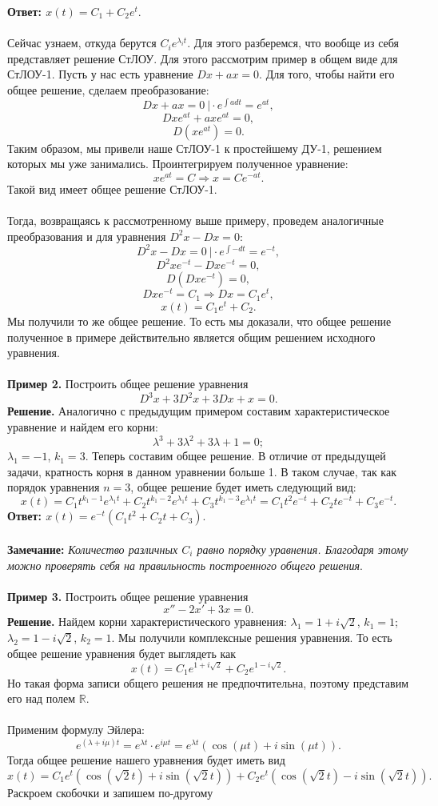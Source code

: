 \documentclass[a4paper, 12pt]{article}
\newcommand{\Rm}{\mathbb{R}}
\begin{document}
	\textbf{Ответ: $x(t) = C_1 + C_2e^t.$}\\\\
	Сейчас узнаем, откуда берутся $C_ie^{\lambda_i t}$. Для этого разберемся, что вообще из себя представляет решение СтЛОУ. Для этого рассмотрим пример в общем виде для СтЛОУ-1. Пусть у нас есть уравнение $Dx + ax = 0$. Для того, чтобы найти его общее решение, сделаем преобразование:
	$$Dx + ax = 0\ \Big| \cdot e^{\int adt}= e^{at},$$
	$$Dxe^{at} + axe^{at} = 0,$$
	$$D(xe^{at}) = 0.$$
	Таким образом, мы привели наше СтЛОУ-1 к простейшему ДУ-1, решением которых мы уже занимались. Проинтегрируем полученное уравнение:
	$$xe^{at} = C\Rightarrow x = Ce^{-at}.$$
	Такой вид имеет общее решение СтЛОУ-1.\\\\
	Тогда, возвращаясь к рассмотренному выше примеру, проведем аналогичные преобразования и для уравнения $D^2x - Dx = 0$:
	$$D^2x - Dx = 0\ \Big| \cdot e^{\int-dt} = e^{-t},$$
	$$D^2xe^{-t} - Dxe^{-t} = 0,$$
	$$D(Dxe^{-t}) = 0,$$
	$$Dxe^{-t} = C_1\Rightarrow Dx = C_1e^t,$$
	$$x(t) = C_1e^t + C_2.$$
	Мы получили то же общее решение. То есть мы доказали, что общее решение полученное в примере действительно является общим решением исходного уравнения.\\\\
	\textbf{Пример 2.} Построить общее решение уравнения $$D^3x + 3D^2x + 3Dx + x = 0.$$
	\textbf{Решение.} Аналогично с предыдущим примером составим характеристическое уравнение и найдем его корни: $$\lambda^3 + 3\lambda^2 + 3\lambda + 1 = 0;$$
	$\lambda_1 = -1$, $k_1 = 3$. Теперь составим общее решение. В отличие от предыдущей задачи, кратность корня в данном уравнении больше 1. В таком случае, так как порядок уравнения $n = 3$, общее решение будет иметь следующий вид:
	$$x(t) = C_1t^{k_1 - 1}e^{\lambda_1 t} + C_2t^{k_1 - 2}e^{\lambda_1 t} + C_3t^{k_1 - 3}e^{\lambda_1 t} = C_1t^2e^{-t} + C_2te^{-t} + C_3e^{-t}.$$
	\textbf{Ответ: $x(t) = e^{-t}(C_1t^2 + C_2t + C_3).$}
	\\\\
	\textbf{Замечание:} \textit{Количество различных $C_i$ равно порядку уравнения. Благодаря этому можно проверять себя на правильность построенного общего решения}.\\\\
	\textbf{Пример 3.} Построить общее решение уравнения $$x'' - 2x' + 3x = 0.$$
	\textbf{Решение.} Найдем корни характеристического уравнения: $\lambda_1 = 1 + i\sqrt{2}$, $k_1 = 1$; $\lambda_2 = 1 - i\sqrt{2}$, $k_2 = 1$. Мы получили комплексные решения уравнения. То есть общее решение уравнения будет выглядеть как $$x(t) = C_1e^{1+i\sqrt{2}} + C_2e^{1-i\sqrt{2}}.$$ Но такая форма записи общего решения не предпочтительна, поэтому представим его над полем $\Rm$.\\\\ Применим формулу Эйлера: $$e^{(\lambda + i\mu)t} = e^{\lambda t}\cdot e^{i\mu t} = e^{\lambda t}(\cos(\mu t) + i \sin(\mu t)).$$ Тогда общее решение нашего уравнения будет иметь вид $$x(t) = C_1e^t(\cos(\sqrt{2}t) + i \sin(\sqrt{2}t)) + C_2e^t(\cos(\sqrt{2}t) - i \sin(\sqrt{2}t)).$$ Раскроем скобочки и запишем по-другому
\end{document}
